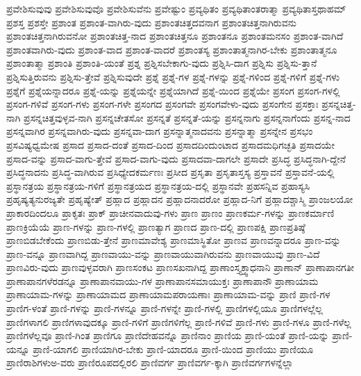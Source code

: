 {ಪ್ರವೇಶಿಸುವುವು
ಪ್ರವೇಶಿಸುವುವೊ
ಪ್ರವೇಶಿಸುವೆನು
ಪ್ರವೇಷ್ಟುಂ
ಪ್ರವ್ಯಥಿತಂ
ಪ್ರವ್ಯಥಿತಾಂತರಾತ್ಮಾ
ಪ್ರವ್ಯಥಿತಾಸ್ತಥಾಹಮ್
ಪ್ರಶಸ್ತ
ಪ್ರಶಸ್ತೇ
ಪ್ರಶಾಂತ
ಪ್ರಶಾಂತ-ವಾಗಿರು-ವುದು
ಪ್ರಶಾಂತಚಿತ್ತದವನಾಗ
ಪ್ರಶಾಂತಚಿತ್ತನಾಗಿರುವನು
ಪ್ರಶಾಂತಚಿತ್ತನಾಗಿರುವನೋ
ಪ್ರಶಾಂತಚಿತ್ತ-ನಾದ
ಪ್ರಶಾಂತಚಿತ್ತನೂ
ಪ್ರಶಾಂತನೂ
ಪ್ರಶಾಂತಮನಸಂ
ಪ್ರಶಾಂತ-ವಾಗಿದೆ
ಪ್ರಶಾಂತವಾಗಿರು-ವುದು
ಪ್ರಶಾಂತ-ವಾದ
ಪ್ರಶಾಂತ-ವಾದರೆ
ಪ್ರಶಾಂತಸ್ಯ
ಪ್ರಶಾಂತಾತ್ಮನಾಗಿರ-ಬೇಕು
ಪ್ರಶಾಂತಾತ್ಮನೂ
ಪ್ರಶಾಂತಾತ್ಮಾ
ಪ್ರಶಾಂತಿ
ಪ್ರಶಾಂತಿ-ಯಂತೆ
ಪ್ರಶ್ನ
ಪ್ರಶ್ನಿಸಬೇಕಾಗು-ವುದು
ಪ್ರಶ್ನಿಸಿ-ದಾಗ
ಪ್ರಶ್ನಿಸು
ಪ್ರಶ್ನಿಸು-ತ್ತಾನೆ
ಪ್ರಶ್ನಿಸುತ್ತಿರುವನು
ಪ್ರಶ್ನಿಸು-ತ್ತೇವೆ
ಪ್ರಶ್ನಿಸುವುದೇ
ಪ್ರಶ್ನೆ
ಪ್ರಶ್ನೆ-ಗಳ
ಪ್ರಶ್ನೆ-ಗಳನ್ನು
ಪ್ರಶ್ನೆ-ಗಳಿಂದ
ಪ್ರಶ್ನೆ-ಗಳಿಗೆ
ಪ್ರಶ್ನೆ-ಗಳು
ಪ್ರಶ್ನೆಗೆ
ಪ್ರಶ್ನೆಯನ್ನಾದರೂ
ಪ್ರಶ್ನೆ-ಯನ್ನು
ಪ್ರಶ್ನೆಯನ್ನೇ
ಪ್ರಶ್ನೆಯಾಗಿದೆ
ಪ್ರಶ್ನೆ-ಯಿಂದ
ಪ್ರಶ್ನೆಯೇ
ಪ್ರಸಂಗ
ಪ್ರಸಂಗ-ಗಳಲ್ಲಿ
ಪ್ರಸಂಗ-ಗಳಿವೆ
ಪ್ರಸಂಗ-ಗಳು
ಪ್ರಸಂಗ-ಗಳೇ
ಪ್ರಸಂಗದ
ಪ್ರಸಂಗವೇ
ಪ್ರಸಂಗವೇಳು-ವುದು
ಪ್ರಸಂಗೇನ
ಪ್ರಸಕ್ತಾಃ
ಪ್ರಸನ್ನಚಿತ್ತ-ನಾಗಿ
ಪ್ರಸನ್ನಚಿತ್ತವುಳ್ಳವ-ನಾಗಿ
ಪ್ರಸನ್ನಚೇತಸೋ
ಪ್ರಸನ್ನತೆ
ಪ್ರಸನ್ನತೆ-ಯನ್ನು
ಪ್ರಸನ್ನನಾಗು
ಪ್ರಸನ್ನನಾಗೆಂದು
ಪ್ರಸನ್ನ-ನಾದ
ಪ್ರಸನ್ನವಾಗಿರ
ಪ್ರಸನ್ನವಾಗಿರು-ವುದು
ಪ್ರಸನ್ನವಾ-ದಾಗ
ಪ್ರಸನ್ನಾತ್ಮನಾದವನು
ಪ್ರಸನ್ನಾತ್ಮಾ
ಪ್ರಸನ್ನೇನ
ಪ್ರಸಭಂ
ಪ್ರಸವಿಷ್ಯಧ್ವಮೇಷ
ಪ್ರಸಾದ
ಪ್ರಸಾದ-ದಂತೆ
ಪ್ರಸಾದ-ದಿಂದ
ಪ್ರಸಾದದಿಂದುಂಟಾದ
ಪ್ರಸಾದಮಧಿಗಚ್ಛತಿ
ಪ್ರಸಾದಯೇ
ಪ್ರಸಾದ-ವನ್ನು
ಪ್ರಸಾದ-ವಾಗು-ತ್ತೇವೆ
ಪ್ರಸಾದ-ವಾಗು-ವುದು
ಪ್ರಸಾದವಾ-ದಾಗಲೇ
ಪ್ರಸಾದೇ
ಪ್ರಸಿದ್ಧ
ಪ್ರಸಿದ್ಧನಾಗಿ-ದ್ದೇನೆ
ಪ್ರಸಿದ್ಧನಾದನು
ಪ್ರಸಿದ್ಧ-ವಾಗಿರುವ
ಪ್ರಸಿಧ್ಯೇದಕರ್ಮಣಃ
ಪ್ರಸೀದ
ಪ್ರಸೃತಾ
ಪ್ರಸೃತಾಸ್ತಸ್ಯ
ಪ್ರಸ್ತಾವನೆ
ಪ್ರಸ್ತಾವನೆ-ಯಲ್ಲಿ
ಪ್ರಸ್ಥಾನತ್ರಯ
ಪ್ರಸ್ಥಾನತ್ರಯ-ಗಳಿಗೆ
ಪ್ರಸ್ಥಾನತ್ರಯದ
ಪ್ರಸ್ಥಾನತ್ರಯ-ದಲ್ಲಿ
ಪ್ರಸ್ಥಾನವೇ
ಪ್ರಹಸನ್ನಿವ
ಪ್ರಹಾಸ್ಯಸಿ
ಪ್ರಹೃಷ್ಯತ್ಯನುರಜ್ಯತೇ
ಪ್ರಹೃಷ್ಯೇತ್
ಪ್ರಹ್ಲಾದ
ಪ್ರಹ್ಲಾದನ
ಪ್ರಹ್ಲಾದನಾದರೋ
ಪ್ರಹ್ಲಾದ-ನಿಗೆ
ಪ್ರಹ್ಲಾದಶ್ಚಾಸ್ಮಿ
ಪ್ರಾಂಜಲಯೋ
ಪ್ರಾಕಾರದಿಂದಲೂ
ಪ್ರಾಕೃತಃ
ಪ್ರಾಕ್
ಪ್ರಾಚೀನವಾದುವು-ಗಳು
ಪ್ರಾಣ
ಪ್ರಾಣಂ
ಪ್ರಾಣಕರ್ಮ-ಗಳನ್ನು
ಪ್ರಾಣಕರ್ಮಾಣಿ
ಪ್ರಾಣಕ್ರಿಯೆಯೆ
ಪ್ರಾಣ-ಗಳನ್ನು
ಪ್ರಾಣ-ಗಳಲ್ಲಿ
ಪ್ರಾಣತ್ಯಾಗ
ಪ್ರಾಣದ
ಪ್ರಾಣ-ದಲ್ಲಿ
ಪ್ರಾಣಪಕ್ಷಿ
ಪ್ರಾಣಪ್ರತಿಷ್ಠೆ
ಪ್ರಾಣಬಿಡಬೇಕೆಂದು
ಪ್ರಾಣಬಿಡು-ತ್ತೇನೆ
ಪ್ರಾಣಮಾವೇಶ್ಯ
ಪ್ರಾಣಮಾಸ್ಥಿತೋ
ಪ್ರಾಣವ
ಪ್ರಾಣವನ್ನಾದರೂ
ಪ್ರಾಣ-ವನ್ನು
ಪ್ರಾಣ-ವನ್ನೂ
ಪ್ರಾಣವಾಗಿದ್ದ
ಪ್ರಾಣವಾಯು-ವನ್ನು
ಪ್ರಾಣವಾಯುವಾಗಿರುವನು
ಪ್ರಾಣವಾಯುವು
ಪ್ರಾಣ-ವಿದೆ
ಪ್ರಾಣವಿರು-ವುದು
ಪ್ರಾಣವುಳ್ಳವರಾಗಿ
ಪ್ರಾಣಸಂಕಟ
ಪ್ರಾಣಸಖನಾಗಿದ್ದ
ಪ್ರಾಣಾಂಸ್ತ್ಯಕ್ತ್ವಾಧನಾನಿ
ಪ್ರಾಣಾನ್
ಪ್ರಾಣಾಪಾನಗತೀ
ಪ್ರಾಣಾಪಾನಗಳೆರಡನ್ನೂ
ಪ್ರಾಣಾಪಾನವಾಯು-ಗಳ
ಪ್ರಾಣಾಪಾನಸಮಾಯುಕ್ತಃ
ಪ್ರಾಣಾಪಾನೌ
ಪ್ರಾಣಾಯಾಮ
ಪ್ರಾಣಾಯಾಮ-ಗಳನ್ನು
ಪ್ರಾಣಾಯಾಮದ
ಪ್ರಾಣಾಯಾಮಪರಾಯಣಾಃ
ಪ್ರಾಣಾಯಾಮ-ವನ್ನು
ಪ್ರಾಣಿ
ಪ್ರಾಣಿ-ಗಳ
ಪ್ರಾಣಿಗ-ಳಂತೆ
ಪ್ರಾಣಿ-ಗಳನ್ನು
ಪ್ರಾಣಿ-ಗಳನ್ನೂ
ಪ್ರಾಣಿ-ಗಳನ್ನೇ
ಪ್ರಾಣಿ-ಗಳಲ್ಲಿ
ಪ್ರಾಣಿಗಳಲ್ಲಿಯೂ
ಪ್ರಾಣಿಗಳಲ್ಲೆಲ್ಲ
ಪ್ರಾಣಿಗಳಾಗಲಿ
ಪ್ರಾಣಿಗಳಾವುದಕ್ಕೂ
ಪ್ರಾಣಿ-ಗಳಿಗೆ
ಪ್ರಾಣಿಗಳಿಗೆಲ್ಲ
ಪ್ರಾಣಿ-ಗಳಿವೆ
ಪ್ರಾಣಿ-ಗಳು
ಪ್ರಾಣಿ-ಗಳೂ
ಪ್ರಾಣಿ-ಗಳೆಲ್ಲ
ಪ್ರಾಣಿಗಳೆಲ್ಲವೂ
ಪ್ರಾಣಿ-ಗಿಂತ
ಪ್ರಾಣಿಗೂ
ಪ್ರಾಣಿದೇಹವನ್ನೊ
ಪ್ರಾಣಿನಾಂ
ಪ್ರಾಣಿಯ
ಪ್ರಾಣಿ-ಯಂತೆ
ಪ್ರಾಣಿ-ಯನ್ನು
ಪ್ರಾಣಿ-ಯನ್ನೂ
ಪ್ರಾಣಿ-ಯಾಗಲಿ
ಪ್ರಾಣಿಯಾಗಿರ-ಬೇಕು
ಪ್ರಾಣಿ-ಯಾದರೂ
ಪ್ರಾಣಿ-ಯಿಂದ
ಪ್ರಾಣಿಯು
ಪ್ರಾಣಿಯೂ
ಪ್ರಾಣಿರಾಶಿಗಳುಅ-ವರು
ಪ್ರಾಣಿರೂಪದಲ್ಲಿರಲಿ
ಪ್ರಾಣಿವರ್ಗ
ಪ್ರಾಣಿವರ್ಗ-ಕ್ಕಾಗಿ
ಪ್ರಾಣಿವರ್ಗಗಳನ್ನೆಲ್ಲಾ
}
